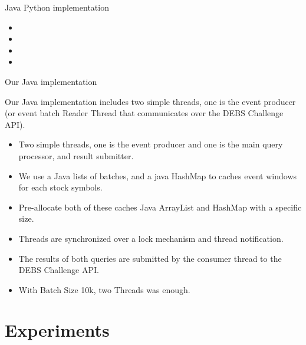 \documentclass[9pt]{beamer}
\begin{document}
\begin{frame}[fragile]{Java Python implementation }

    
    \begin{itemize}
        \item 
        \item 
        \item 
        \item 

    \end{itemize}


    
\end{frame}


\begin{frame}[fragile]{Our Java implementation }
    
    Our Java implementation includes two simple threads, one is the event producer (or event batch Reader Thread that communicates over the DEBS Challenge API). 
    \begin{itemize}
        \item Two simple threads, one is the event producer and one is the main query processor,  and result submitter. 
        \item We use a Java lists of batches, and a java HashMap to caches event windows for each stock symbols. 
        \item Pre-allocate both of these caches Java ArrayList and HashMap with a specific size.
        \item Threads are synchronized over a lock mechanism and thread notification.
        \item The results of both queries are submitted by the consumer thread to the DEBS Challenge API.
        \item With Batch Size 10k, two Threads was enough. 
    \end{itemize}


    
\end{frame}





\section{Experiments}
\end{document}
